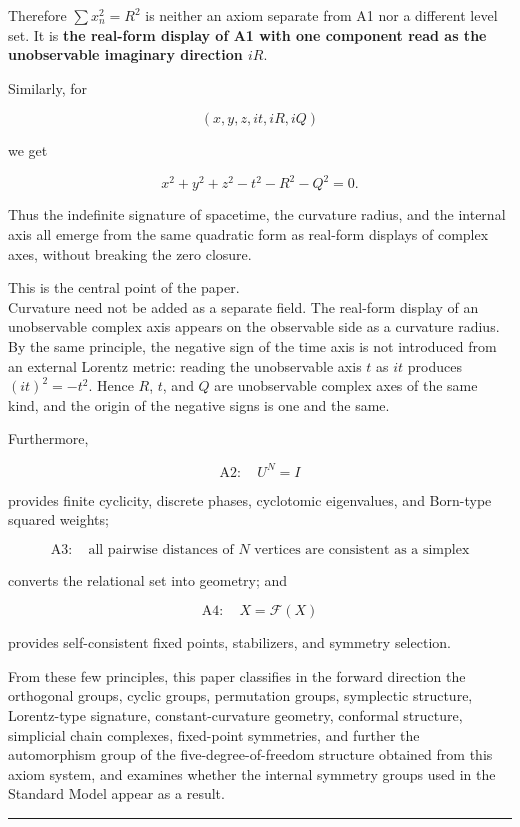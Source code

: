 \documentclass[
  a4paper,
]{article}
\begin{document}
Therefore \(\sum x_n^2=R^2\) is neither an axiom separate from A1 nor a
different level set. It is \textbf{the real-form display of A1 with one
component read as the unobservable imaginary direction \(iR\)}.

Similarly, for

\[
(x,y,z,it,iR,iQ)
\]

we get

\[
x^2+y^2+z^2-t^2-R^2-Q^2=0.
\]

Thus the indefinite signature of spacetime, the curvature radius, and
the internal axis all emerge from the same quadratic form as real-form
displays of complex axes, without breaking the zero closure.

This is the central point of the paper.\\
Curvature need not be added as a separate field. The real-form display
of an unobservable complex axis appears on the observable side as a
curvature radius. By the same principle, the negative sign of the time
axis is not introduced from an external Lorentz metric: reading the
unobservable axis \(t\) as \(it\) produces \((it)^2=-t^2\). Hence \(R\),
\(t\), and \(Q\) are unobservable complex axes of the same kind, and the
origin of the negative signs is one and the same.

Furthermore,

\[
\boxed{
\mathrm{A2}:\quad U^N=I
}
\]

provides finite cyclicity, discrete phases, cyclotomic eigenvalues, and
Born-type squared weights;

\[
\boxed{
\mathrm{A3}:\quad
\text{all pairwise distances of }N\text{ vertices are consistent as a simplex}
}
\]

converts the relational set into geometry; and

\[
\boxed{
\mathrm{A4}:\quad X=\mathcal F(X)
}
\]

provides self-consistent fixed points, stabilizers, and symmetry
selection.

From these few principles, this paper classifies in the forward
direction the orthogonal groups, cyclic groups, permutation groups,
symplectic structure, Lorentz-type signature, constant-curvature
geometry, conformal structure, simplicial chain complexes, fixed-point
symmetries, and further the automorphism group of the
five-degree-of-freedom structure obtained from this axiom system, and
examines whether the internal symmetry groups used in the Standard Model
appear as a result.

\begin{center}\rule{0.5\linewidth}{0.5pt}\end{center}
\end{document}
